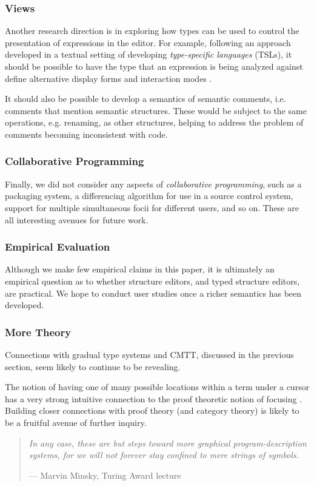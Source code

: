 \documentclass[preprint,9pt]{sigplanconf}
\begin{document}
\subsubsection{Views}
Another research direction is in exploring how types can be used to control
the presentation of expressions in the editor. For example, following an
approach developed in a textual setting of developing \emph{type-specific
languages} (TSLs), it should be possible to have the type that an
expression is being analyzed against define alternative display forms and
interaction modes \cite{TSLs}.

It should also be possible to develop a semantics of semantic comments,
i.e. comments that mention semantic structures. These would be subject to
the same operations, e.g. renaming, as other structures, helping to address
the problem of comments becoming inconsistent with code.

\subsubsection{Collaborative Programming}
Finally, we did not consider any aspects of \emph{collaborative
programming}, such as a packaging system, a differencing algorithm for use
in a source control system, support for multiple simultaneous focii for
different users, and so on. These are all interesting avenues for future
work.

\subsubsection{Empirical Evaluation}
Although we make few empirical claims in this paper, it is ultimately an
empirical question as to whether structure editors, and typed structure
editors, are practical. We hope to conduct user studies once a richer
semantics has been developed.

\subsubsection{More Theory}
Connections with gradual type systems and CMTT, discussed in the previous
section, seem likely to continue to be revealing.

The notion of having one of many possible locations within a term under a
cursor has a very strong intuitive connection to the proof theoretic notion
of focusing \cite{Simmons11tr}. Building closer connections with proof
theory (and category theory) is likely to be a fruitful avenue of further
inquiry.

\begin{quote}
\emph{In any case, these are but steps toward more graphical program-description
systems, for we will not forever stay confined to mere strings of symbols.}

--- Marvin Minsky, Turing Award lecture \cite{DBLP:journals/jacm/Minsky70}
\end{quote}

\clearpage




\iftr
\clearpage
\appendix

\else
\fi
\end{document}
